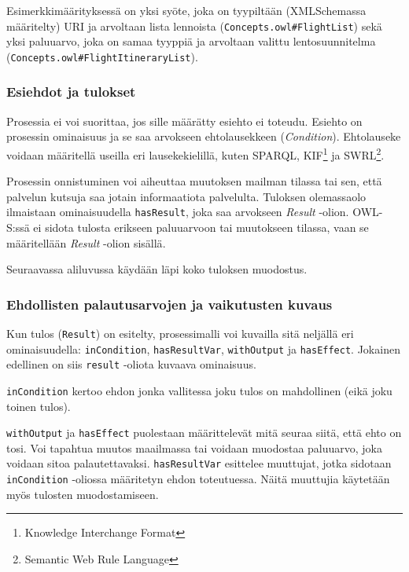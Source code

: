 \documentclass[finnish]{tktltiki2}
\theoremstyle{definition}
\theoremstyle{remark}
\begin{document}
Esimerkkimäärityksessä on yksi syöte, joka on tyypiltään (XMLSchemassa määritelty)  URI ja arvoltaan lista lennoista (\texttt{Concepts.owl\#FlightList}) sekä yksi paluuarvo, joka on samaa tyyppiä ja arvoltaan valittu lentosuunnitelma (\texttt{Concepts.owl\#FlightItineraryList}). 


\subsubsection{Esiehdot ja tulokset}

Prosessia ei voi suorittaa, jos sille määrätty esiehto ei toteudu\cite{OWLS}. Esiehto on prosessin ominaisuus ja se saa arvokseen ehtolausekkeen (\textit{Condition}). Ehtolauseke voidaan määritellä useilla eri lausekekielillä, kuten SPARQL, KIF\footnote{Knowledge Interchange Format} ja SWRL\footnote{Semantic Web Rule Language}. 

Prosessin onnistuminen voi aiheuttaa muutoksen mailman tilassa tai sen, että palvelun kutsuja saa jotain informaatiota palvelulta. Tuloksen olemassaolo ilmaistaan ominaisuudella \texttt{hasResult}, joka saa arvokseen \textit{Result} -olion.  OWL-S:ssä ei sidota tulosta erikseen paluuarvoon tai muutokseen tilassa, vaan se määritellään \textit{Result} -olion sisällä\cite{OWLS}. 

Seuraavassa aliluvussa käydään läpi koko tuloksen muodostus.

\subsubsection{Ehdollisten palautusarvojen ja vaikutusten kuvaus}

Kun tulos (\texttt{Result}) on esitelty, prosessimalli voi kuvailla sitä neljällä eri ominaisuudella\cite{OWLS}: \texttt{inCondition}, \texttt{hasResultVar}, \texttt{withOutput} ja \texttt{hasEffect}\cite{OWLS}.  Jokainen edellinen on siis \texttt{result} -oliota kuvaava ominaisuus.  

\texttt{inCondition} kertoo ehdon jonka vallitessa joku tulos on mahdollinen (eikä joku toinen tulos). 

\texttt{withOutput} ja \texttt{hasEffect} puolestaan määrittelevät mitä seuraa siitä, että ehto on tosi. Voi tapahtua muutos maailmassa tai voidaan muodostaa paluuarvo, joka voidaan sitoa palautettavaksi. \texttt{hasResultVar} esittelee muuttujat, jotka sidotaan \texttt{inCondition} -oliossa määritetyn ehdon toteutuessa.  Näitä muuttujia käytetään myös tulosten muodostamiseen\cite{OWLS}. 
\end{document}
